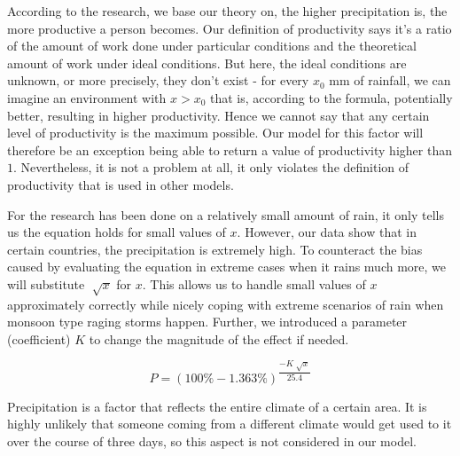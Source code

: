According to the research, we base our theory on, the higher precipitation is, the more productive a person becomes. Our definition of productivity says it's a ratio of the amount of work done under particular conditions and the theoretical amount of work under ideal conditions. But here, the ideal conditions are unknown, or more precisely, they don't exist - for every $x_0$ mm of rainfall, we can imagine an environment with $x > x_0$ that is, according to the formula, potentially better, resulting in higher productivity. Hence we cannot say that any certain level of productivity is the maximum possible. Our model for this factor will therefore be an exception being able to return a value of productivity higher than $1$. Nevertheless, it is not a problem at all, it only violates the definition of productivity that is used in other models.

For the research has been done on a relatively small amount of rain, it only tells us the equation holds for small values of $x$. However, our data show that in certain countries, the precipitation is extremely high. To counteract the bias caused by evaluating the equation in extreme cases when it rains much more, we will substitute $\sqrt[]{x}$ for $x$. This allows us to handle small values of $x$ approximately correctly while nicely coping with extreme scenarios of rain when monsoon type raging storms happen. Further, we introduced a parameter (coefficient) $K$ to change the magnitude of the effect if needed.

$$P = \left( 100\% - 1.363\% \right)^{\dfrac{-K \sqrt[]{x}}{25.4} }$$

Precipitation is a factor that reflects the entire climate of a certain area. It is highly unlikely that someone coming from a different climate would get used to it over the course of three days, so this aspect is not considered in our model.

